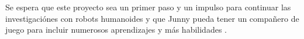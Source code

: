 Se espera que este proyecto sea un primer paso y un impulso para continuar las investigaci\'ones con robots humanoides y que Junny pueda tener un compa\~nero de juego para incluir numerosos aprendizajes y m\'as habilidades .

